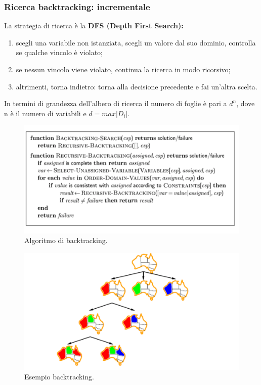 \subsubsection{Ricerca backtracking: incrementale}
La strategia di ricerca è la \textbf{DFS (Depth First Search):}
\begin{enumerate}
    \item scegli una variabile non istanziata, scegli un valore dal suo dominio, controlla se qualche vincolo è violato;
    \item se nessun vincolo viene violato, continua la ricerca in modo ricorsivo;
    \item altrimenti, torna indietro: torna alla decisione precedente e fai un’altra scelta.
\end{enumerate}
In termini di grandezza dell’albero di ricerca il numero di foglie è pari a $d^n$, dove n è il numero di variabili e $d = max|D_i|$.

\begin{figure}[htp]
	\centering
    \includegraphics[width=12cm, keepaspectratio]{img/Cap2/dfs.png}
    \caption{Algoritmo di backtracking.}
\end{figure}
\begin{figure}[htp]
	\centering
    \includegraphics[width=12cm, keepaspectratio]{img/Cap2/dfs2.png}
    \caption{Esempio backtracking.}
\end{figure}

